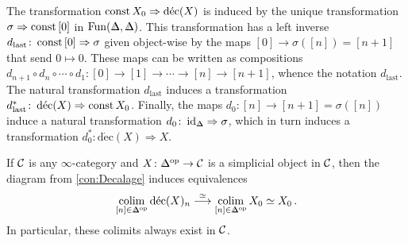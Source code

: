 \begin{con}
	The transformation $\operatorname{const} X_0\Rightarrow \operatorname{d\acute{e}c}(X)$ is induced by the unique transformation $\sigma\Rightarrow \operatorname{const} {[0]}$ in $\Fun(\IDelta,\IDelta)$. This transformation has a left inverse $d_\mathrm{last}\colon \operatorname{const} {[0]}\Rightarrow \sigma$ given object-wise by the maps $[0]\rightarrow \sigma([n])=[n+1]$ that send $0\mapsto 0$. These maps can be written as compositions $d_{n+1}\circ d_n\circ \dotsb\circ d_1\colon [0]\rightarrow [1]\rightarrow \dotsb\rightarrow [n]\rightarrow [n+1]$, whence the notation $d_\mathrm{last}$. The natural transformation $d_\mathrm{last}$ induces a transformation $d_\mathrm{last}^*\colon \operatorname{d\acute{e}c}(X)\Rightarrow \operatorname{const} X_0$. Finally, the maps $d_0\colon [n]\rightarrow [n+1]=\sigma([n])$ induce a natural transformation $d_0\colon \id_{\IDelta}\Rightarrow \sigma$, which in turn induces a transformation $d_0^*\colon \operatorname{d\acute{e}c}(X)\Rightarrow X$.
\end{con}
\begin{lem}\label{lem:DecalageColimit}
	If $\mathcal{C}$ is any $\infty$-category and $X\colon \IDelta^\op\rightarrow\Cc$ is a simplicial object in $\mathcal{C}$, then the diagram from \cref{con:Decalage} induces equivalences
	\begin{equation*}
		\colimit_{[n]\in\IDelta^\op}\operatorname{d\acute{e}c}(X)_n\overset{\simeq}{\longrightarrow}\colimit_{[n]\in\IDelta^\op}X_0\simeq X_0\,.
	\end{equation*}
	In particular, these colimits always exist in $\mathcal{C}$.
\end{lem}
